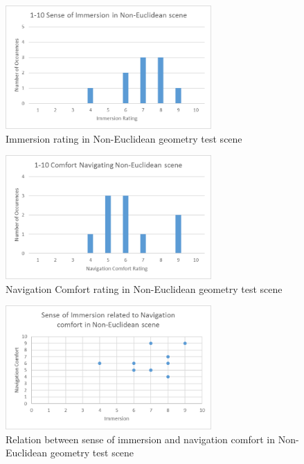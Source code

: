 	\begin{figure}
		\label{exp:fig:ne_immersion}
		\includegraphics[width=0.7\textwidth]{Images/NE_Immersion}
		\centering
		\caption{Immersion rating in Non-Euclidean geometry test scene}
	\end{figure}

	\begin{figure}
		\label{exp:fig:ne_comfort}
		\includegraphics[width=0.7\textwidth]{Images/NE_Comfort}
		\centering
		\caption{Navigation Comfort rating in Non-Euclidean geometry test scene}
	\end{figure}

	\begin{figure}
		\label{exp:fig:ne_relation}
		\includegraphics[width=0.7\textwidth]{Images/NE_Relation}
		\centering
		\caption{Relation between sense of immersion and navigation comfort in Non-Euclidean geometry test scene}
	\end{figure}

